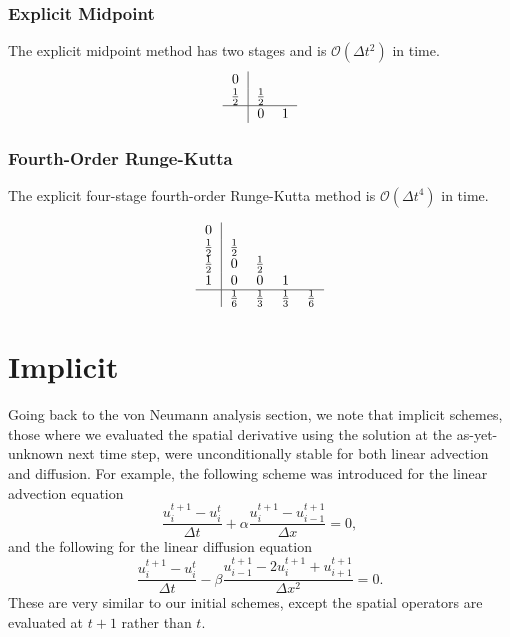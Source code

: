 \subsubsection{Explicit Midpoint}
The explicit midpoint method has two stages and is $\mathcal{O}(\Delta t^2)$ in time.
\begin{equation}
	\begin{tabular}{c|ccccc}
	0   & \\
	$\frac{1}{2}$   & $\frac{1}{2}$ \\
	\hline
	         & 0 & 1\\
	\end{tabular}
\end{equation}


\subsubsection{Fourth-Order Runge-Kutta}
The explicit four-stage fourth-order Runge-Kutta method is $\mathcal{O}(\Delta t^4)$ in time.

\begin{equation}
	\begin{tabular}{c|ccccc}
	0   & \\
	$\frac{1}{2}$   & $\frac{1}{2}$ \\
	$\frac{1}{2}$   & 0 & $\frac{1}{2}$ \\
	$1$   & 0 & 0 & 1 \\
	\hline
	         & $\frac{1}{6}$ & $\frac{1}{3}$ & $\frac{1}{3}$ & $\frac{1}{6}$\\
	\end{tabular}
\end{equation}

\section{Implicit}
Going back to the von Neumann analysis section, we note that implicit schemes, those where we evaluated the spatial derivative using the solution at the as-yet-unknown next time step, were unconditionally stable for both linear advection and diffusion. For example, the following scheme was introduced for the linear advection equation
\begin{equation}
	\frac{u_i^{t+1} - u_{i}^t}{\Delta t} +  \alpha \frac{u_i^{t+1} - u_{i-1}^{t+1}}{\Delta x} = 0,
\end{equation}
and the following for the linear diffusion equation
\begin{equation}
  \frac{u_i^{t+1} - u_{i}^t}{\Delta t} - \beta \frac{u_{i-1}^{t+1} - 2u_i^{t+1} + u_{i+1}^{t+1}}{\Delta x^2} = 0.
\end{equation}
These are very similar to our initial schemes, except the spatial operators are evaluated at $t+1$ rather than $t$.

